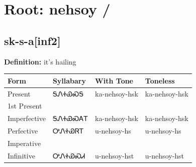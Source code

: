 \documentclass{article}%
\begin{document}
%
\normalsize%
\section*{Root: nehsoy / }%
\subsection*{sk-s-a[inf2]}%
\textbf{Definition: }%
it’s hailing%
\\[0.5em]%
\begin{tabular}{|l|l|l|l|}%
\hline%
\textbf{Form}&\textbf{Syllabary}&\textbf{With Tone}&\textbf{Toneless}\\%
\hline%
Present&ᎦᏁᏐᏯᏍᎦ&ka{-}nehsoy{-}hsk&ka{-}nehsoy{-}hsk\\%
1st Present&&&\\%
Imperfective&ᎦᏁᏐᏯᏍᎪᎢ&ka{-}nehsoy{-}hsk&ka{-}nehsoy{-}hsk\\%
Perfective&ᎤᏁᏐᏯᏒᎢ&u{-}nehsoy{-}hs&u{-}nehsoy{-}hs\\%
Imperative&&&\\%
Infinitive&ᎤᏁᏐᏯᏍᏗ&u{-}nehsoy{-}hst&u{-}nehsoy{-}hst\\%
\hline%
\end{tabular}%
\\[1em]%
\end{document}
